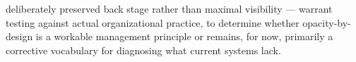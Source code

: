 \documentclass[12pt, a4paper]{article}
\begin{document}
deliberately preserved back stage rather than maximal visibility --- warrant testing against actual organizational practice, to determine whether opacity-by-design is a workable management principle or remains, for now, primarily a corrective vocabulary for diagnosing what current systems lack.

\printbibliography
\end{document}
